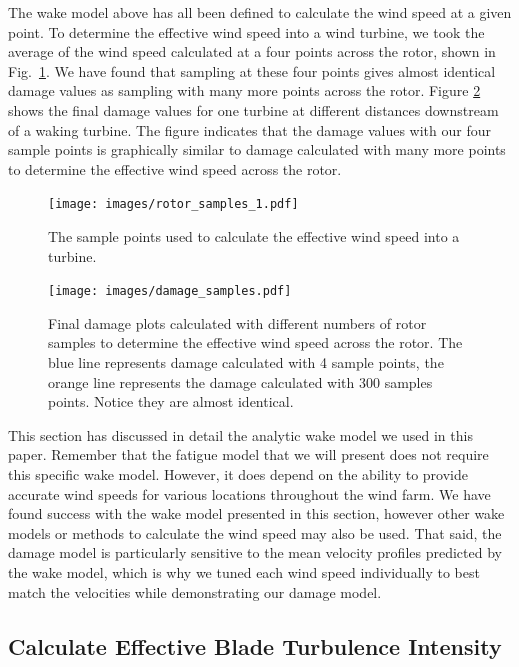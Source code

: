 \documentclass[11pt,letterpaper]{article}
\begin{document}
The wake model above has all been defined to calculate the wind speed at a given point. To determine the effective wind speed into a wind turbine, we took the average of the wind speed calculated at a four points across the rotor, shown in Fig.~\ref{speed_samples}. We have found that sampling at these four points gives almost identical damage values as sampling with many more points across the rotor. Figure \ref{damage_samples} shows the final damage values for one turbine at different distances downstream of a waking turbine. The figure indicates that the damage values with our four sample points is graphically similar to damage calculated with many more points to determine the effective wind speed across the rotor.
% 
\begin{figure}
    \centering
    \hspace*{0.7cm} 
    \texttt{[image: images/rotor\_samples\_1.pdf]}
    \caption{The sample points used to calculate the effective wind speed into a turbine.}
    \label{speed_samples}
\end{figure}

\begin{figure}
    \centering
    \texttt{[image: images/damage\_samples.pdf]}
    \caption{Final damage plots calculated with different numbers of rotor samples to determine the effective wind speed across the rotor. The blue line represents damage calculated with 4 sample points, the orange line represents the damage calculated with 300 samples points. Notice they are almost identical.}
    \label{damage_samples}
\end{figure}

This section has discussed in detail the analytic wake model we used in this paper. Remember that the fatigue model that we will present does not require this specific wake model. However, it does depend on the ability to provide accurate wind speeds for various locations throughout the wind farm. We have found success with the wake model presented in this section, however other wake models or methods to calculate the wind speed may also be used. That said, the damage model is particularly sensitive to the mean velocity profiles predicted by the wake model, which is why we tuned each wind speed individually to best match the velocities while demonstrating our damage model.

\subsection{Calculate Effective Blade Turbulence Intensity}
\label{sec:TI}
\end{document}
